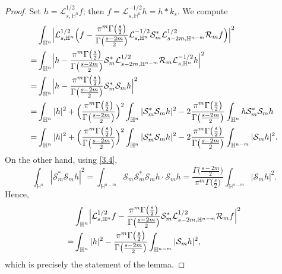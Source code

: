 \documentclass[12pt,reqno]{amsart}%
\theoremstyle{plain}
\numberwithin{equation}{section}
\begin{document}
\begin{proof}
Set \(h=\mathcal{L}_{s,\mathbb{H}^{n}}^{1/2}f\); then \(f=\mathcal{L}_{s,\mathbb{H}^{n}}^{-1/2}h=h\ast k_s\). We compute
\begin{align*}
&\int_{\mathbb{H}^{n}}\Bigl|\mathcal{L}_{s,\mathbb{H}^{n}}^{1/2}\Bigl(f-
\frac{\pi^{m}\Gamma\bigl(\frac{s}{2}\bigr)}{\Gamma\bigl(\frac{s-2m}{2}\bigr)}
\mathcal{L}_{s,\mathbb{H}^{n}}^{-1/2}\mathcal{S}_{m}^{\ast}
\mathcal{L}_{s-2m,\mathbb{H}^{n-m}}^{1/2}\mathcal{R}_{m}f\Bigr)\Bigr|^{2} \\
=& \int_{\mathbb{H}^{n}}\Bigl|h-
\frac{\pi^{m}\Gamma\bigl(\frac{s}{2}\bigr)}{\Gamma\bigl(\frac{s-2m}{2}\bigr)}
\mathcal{S}_{m}^{\ast}\mathcal{L}_{s-2m,\mathbb{H}^{n-m}}^{1/2}
\mathcal{R}_{m}\mathcal{L}_{s,\mathbb{H}^{n}}^{-1/2}h\Bigr|^{2} \\
=& \int_{\mathbb{H}^{n}}\Bigl|h-
\frac{\pi^{m}\Gamma\bigl(\frac{s}{2}\bigr)}{\Gamma\bigl(\frac{s-2m}{2}\bigr)}
\mathcal{S}_{m}^{\ast}\mathcal{S}_{m}h\Bigr|^{2} \\
=& \int_{\mathbb{H}^{n}}|h|^{2}
+ \Bigl(\frac{\pi^{m}\Gamma\bigl(\frac{s}{2}\bigr)}{\Gamma\bigl(\frac{s-2m}{2}\bigr)}\Bigr)^{2}
\int_{\mathbb{H}^{n}}|\mathcal{S}_{m}^{\ast}\mathcal{S}_{m}h|^{2}
- 2\frac{\pi^{m}\Gamma\bigl(\frac{s}{2}\bigr)}{\Gamma\bigl(\frac{s-2m}{2}\bigr)}
\int_{\mathbb{H}^{n}}h\mathcal{S}_{m}^{\ast}\mathcal{S}_{m}h \\
=& \int_{\mathbb{H}^{n}}|h|^{2}
+ \Bigl(\frac{\pi^{m}\Gamma\bigl(\frac{s}{2}\bigr)}{\Gamma\bigl(\frac{s-2m}{2}\bigr)}\Bigr)^{2}
\int_{\mathbb{H}^{n}}|\mathcal{S}_{m}^{\ast}\mathcal{S}_{m}h|^{2}
- 2\frac{\pi^{m}\Gamma\bigl(\frac{s}{2}\bigr)}{\Gamma\bigl(\frac{s-2m}{2}\bigr)}
\int_{\mathbb{H}^{n-m}}|\mathcal{S}_{m}h|^{2}.
\end{align*}
On the other hand, using \eqref{3.4},
\[
\int_{\mathbb{H}^{n}}|\mathcal{S}_{m}^{\ast}\mathcal{S}_{m}h|^{2}
= \int_{\mathbb{H}^{n-m}}\mathcal{S}_{m}\mathcal{S}_{m}^{\ast}\mathcal{S}_{m}h\cdot\mathcal{S}_{m}h
= \frac{\Gamma\bigl(\frac{s-2m}{2}\bigr)}{\pi^{m}\Gamma\bigl(\frac{s}{2}\bigr)}
\int_{\mathbb{H}^{n-m}}|\mathcal{S}_{m}h|^{2}.
\]
Hence,
\begin{align*}
&\int_{\mathbb{H}^{n}}\Bigl|\mathcal{L}_{s,\mathbb{H}^{n}}^{1/2}f-
\frac{\pi^{m}\Gamma\bigl(\frac{s}{2}\bigr)}{\Gamma\bigl(\frac{s-2m}{2}\bigr)}
\mathcal{S}_{m}^{\ast}\mathcal{L}_{s-2m,\mathbb{H}^{n-m}}^{1/2}\mathcal{R}_{m}f\Bigr|^{2} \\
=& \int_{\mathbb{H}^{n}}|h|^{2}
- \frac{\pi^{m}\Gamma\bigl(\frac{s}{2}\bigr)}{\Gamma\bigl(\frac{s-2m}{2}\bigr)}
\int_{\mathbb{H}^{n-m}}|\mathcal{S}_{m}h|^{2},
\end{align*}
which is precisely the statement of the lemma.
\end{proof}
\end{document}
